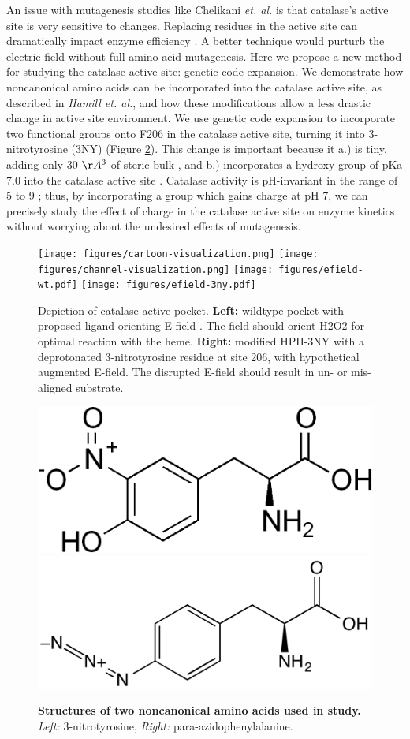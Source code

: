\documentclass[9pt,twocolumn,twoside]{pnas-new}
\begin{document}
An issue with mutagenesis studies like Chelikani \textit{et. al.} is that catalase's active site is very sensitive to changes. Replacing residues in the active site can dramatically impact enzyme efficiency \cite{substrateflow}. A better technique would purturb the electric field without full amino acid mutagenesis. Here we propose a new method for studying the catalase active site: genetic code expansion. We demonstrate how noncanonical amino acids can be incorporated into the catalase active site, as described in \textit{Hamill et. al.}, and how these modifications allow a less drastic change in active site environment. We use genetic code expansion \cite{hammill} to incorporate two functional groups onto F206 in the catalase active site, turning it into 3-nitrotyrosine (3NY) (Figure \ref{fig:noncanonicals}). This change is important because it a.) is tiny, adding only 30 $\AA^3$ of steric bulk \cite{3ntsize}, and b.) incorporates a hydroxy group of pKa 7.0 into the catalase active site \cite{3ntsize}. Catalase activity is pH-invariant in the range of 5 to 9 \cite{phdependence,kcatkm}; thus, by incorporating a group which gains charge at pH 7, we can precisely study the effect of charge in the catalase active site on enzyme kinetics without worrying about the undesired effects of mutagenesis.\\

\begin{figure}
  \texttt{[image: figures/cartoon-visualization.png]}
  \texttt{[image: figures/channel-visualization.png]}
  \texttt{[image: figures/efield-wt.pdf]}
  \texttt{[image: figures/efield-3ny.pdf]}%
  \caption{Depiction of catalase active pocket. \textbf{Left:} wildtype pocket with proposed ligand-orienting E-field \cite{electricpotential}. The field should orient H2O2 for optimal reaction with the heme. \textbf{Right:} modified HPII-3NY with a deprotonated 3-nitrotyrosine residue at site 206, with hypothetical augmented E-field. The disrupted E-field should result in un- or mis-aligned substrate.}
  \label{fig:hypothesis}
\end{figure}

\begin{figure}
  \includegraphics[width=0.4\linewidth]{figures/3ny.png}
  \hspace{0.1\linewidth}
  \includegraphics[width=0.5\linewidth]{figures/pazf.png}
  \caption{\textbf{Structures of two noncanonical amino acids used in study.} \textit{Left:} 3-nitrotyrosine, \textit{Right:} para-azidophenylalanine.}
  \label{fig:noncanonicals}
\end{figure}
\end{document}
